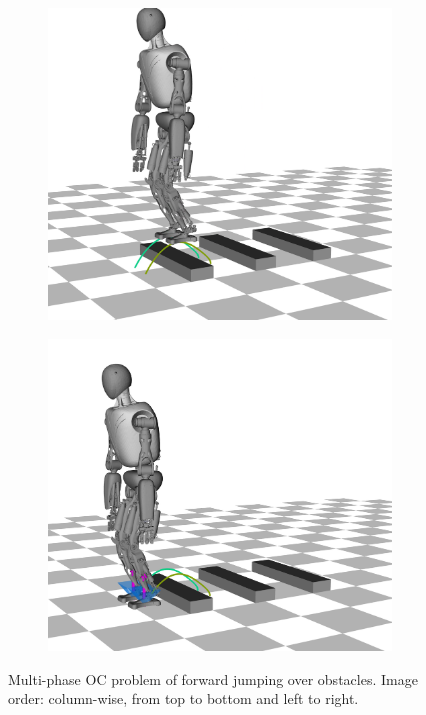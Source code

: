 \begin{figure}[h!]
\begin{subfigure}{.33\textwidth}
	\includegraphics[width=1\linewidth]{fig/jumpObstacles/snaps/6x}
\end{subfigure}%

\begin{subfigure}{.33\textwidth}
	\includegraphics[width=1\linewidth]{fig/jumpObstacles/snaps/7x}
\end{subfigure}%

\caption{Multi-phase \gls{OC} problem of forward jumping over obstacles. Image order: column-wise, from top to bottom and left to right.}
\label{fig:jumpObstacles_Snaps}
\end{figure} 

